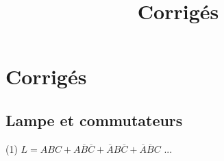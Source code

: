 \documentclass[a4paper,11pt]{book}
\title{Corrigés}
\begin{document}
\chapter{Corrigés}
\section{Lampe et commutateurs}
\begin{tasks}(1)
    \task $L = ABC + A\overline{B}\overline{C} + \overline{A}B\overline{C} + \overline{A}\overline{B}C$
    \task ...
\end{tasks}
\end{document}
